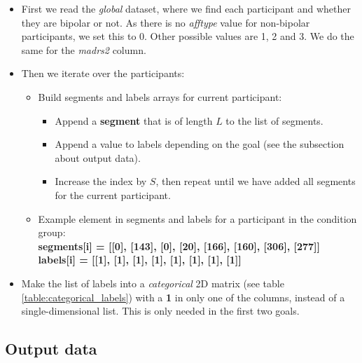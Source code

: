 \begin{itemize}
  \item First we read the \textit{global} dataset, where we find each participant and whether they are bipolar or not. As there is no \textit{afftype} value for non-bipolar participants, we set this to 0. Other possible values are 1, 2 and 3. We do the same for the \textit{madrs2} column.
  \item Then we iterate over the participants:

  \begin{itemize}
    \item Build segments and labels arrays for current participant:
    \begin{itemize}
      \item Append a \textbf{segment} that is of length $L$ to the list of segments. 
      \item Append a value to labels depending on the goal (see the subsection about output data).
      \item Increase the index by $S$, then repeat until we have added all segments for the current participant.
    \end{itemize}
    \item Example element in segments and labels for a participant in the condition group: \\
    \textbf{segments[i] = [[0], [143], [0], [20], [166], [160], [306], [277]]}\\
    \textbf{labels[i] = [[1], [1], [1], [1], [1], [1], [1], [1]]}
  \end{itemize}
  
  \item Make the list of labels into a \textit{categorical} 2D matrix (see table \ref{table:categorical_labels}) with a \textbf{1} in only one of the columns, instead of a single-dimensional list. This is only needed in the first two goals.
\end{itemize}

\subsection{Output data}

